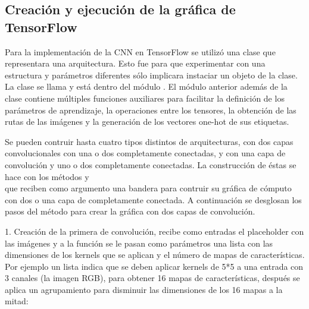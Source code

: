 
\subsection{Creación y ejecución de la gráfica de TensorFlow}
\label{\detokenize{model_desc:creacion-y-ejecucion-de-la-grafica-de-tensorflow}}
Para la implementación de la CNN en TensorFlow
se utilizó una clase que representara una
arquitectura. Esto fue para que experimentar con
una estructura y parámetros diferentes sólo
implicara instaciar un objeto de la clase.
La clase se llama  y
está dentro del módulo {\hyperref[\detokenize{model_desc:module-cnn_indoor_classifier_model}]{}}.
El módulo anterior además de la clase contiene múltiples
funciones auxiliares para facilitar la definición
de los parámetros de aprendizaje, la operaciones entre los
tensores, la obtención de las rutas de las imágenes
y la generación de los vectores one-hot de sus etiquetas.

Se pueden contruir hasta cuatro tipos distintos de
arquitecturas, con dos capas convolucionales con una o dos
completamente conectadas, y con una capa de convolución
y uno o dos completamente conectadas.
La construcción de éstas se hace con los métodos
{\hyperref[\detokenize{model_desc:cnn_indoor_classifier_model.CNNClassifierLAR.create_graph_2_convo_layers}]{}}
y\\ {\hyperref[\detokenize{model_desc:cnn_indoor_classifier_model.CNNClassifierLAR.create_graph_1_convo_layer}]{}}
que reciben como argumento una bandera para contruir su gráfica
de cómputo con dos o una capa de completamente conectada. A
continuación se desglosan los pasos del método para
crear la gráfica con dos capas de convolución.

1. Creación de la primera de convolución, recibe como entradas el placeholder
con las imágenes y a la función se le pasan como parámetros una lista con las dimensiones
de los kernels que se aplican y el número de mapas de características. Por ejemplo
un lista \sphinxcode{\sphinxupquote{{[}5, 5, 3, 16{]}}} indica que se deben aplicar kernels de 5*5 a
una entrada con 3 canales (la imagen RGB), para obtener
16 mapas de características, después se aplica un agrupamiento para disminuir las
dimensiones de los 16 mapas a la mitad:

